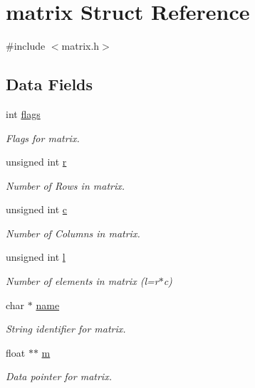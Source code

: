 \hypertarget{structmatrix}{}\section{matrix Struct Reference}
\label{structmatrix}


{\ttfamily \#include $<$matrix.\+h$>$}

\subsection*{Data Fields}
\begin{DoxyCompactItemize}
\item 
int \hyperlink{structmatrix_ab45b487b5fbdfe6df519d054d5acb245}{flags}
\begin{DoxyCompactList}\small\item\em Flags for matrix. \end{DoxyCompactList}\item 
unsigned int \hyperlink{structmatrix_ac5217ab574fd3214f35f417a947b4bb1}{r}
\begin{DoxyCompactList}\small\item\em Number of Rows in matrix. \end{DoxyCompactList}\item 
unsigned int \hyperlink{structmatrix_a9499b963be4febd5b909822a4d0ae290}{c}
\begin{DoxyCompactList}\small\item\em Number of Columns in matrix. \end{DoxyCompactList}\item 
unsigned int \hyperlink{structmatrix_a5be40caa3b21e52f4c60b0846f1bd6b1}{l}
\begin{DoxyCompactList}\small\item\em Number of elements in matrix (l=r$\ast$c) \end{DoxyCompactList}\item 
char $\ast$ \hyperlink{structmatrix_a4b4ce5bf34789557b86c3c501790b72e}{name}
\begin{DoxyCompactList}\small\item\em String identifier for matrix. \end{DoxyCompactList}\item 
float $\ast$$\ast$ \hyperlink{structmatrix_afee3aefd63edf15984ec01e14dcfc8ec}{m}
\begin{DoxyCompactList}\small\item\em Data pointer for matrix. \end{DoxyCompactList}\end{DoxyCompactItemize}



